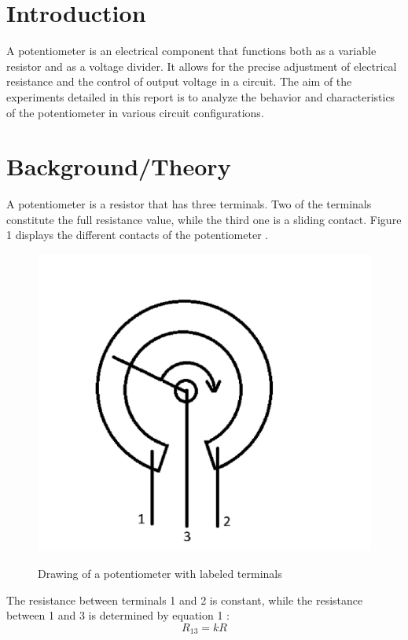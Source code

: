 \documentclass[a4paper]{article}
\begin{document}
\section{Introduction}
A potentiometer is an electrical component that functions both as a variable resistor and as a voltage divider.
It allows for the precise adjustment of electrical resistance and the control of output voltage in a circuit. 
The aim of the experiments detailed in this report is to analyze the behavior and characteristics of the potentiometer
in various circuit configurations.
\section{Background/Theory}
A potentiometer is a resistor that has three terminals. Two of the terminals
constitute the full resistance value, while the third one is a sliding contact.
Figure 1 displays the different contacts of the potentiometer \cite{report}.
\begin{figure}[!ht]
    \centering
    \begin{minipage}{0.4\textwidth}
        \includegraphics[width = \textwidth]{potterminals.png}
       \label{fig:1}
        \caption{\centering Drawing of a potentiometer with labeled terminals}    
    \end{minipage}
\end{figure}

The resistance between terminals 1 and 2 is constant, while the resistance
between 1 and 3 is determined by equation 1 \cite{report}:
\begin{equation}
    R_{13} = kR
\end{equation}
\end{document}
